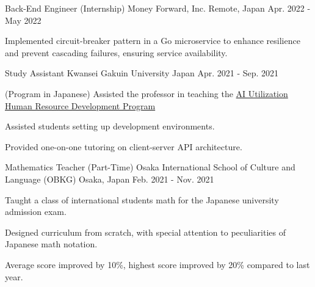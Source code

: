 \begin{cventries}
  \cventry
    {Back-End Engineer (Internship)} %
    {Money Forward, Inc.} %
    {Remote, Japan} %
    {Apr. 2022 - May 2022} %
    {
      \begin{cvitems} %
        \item {Implemented circuit-breaker pattern in a Go microservice to enhance resilience and prevent cascading failures, ensuring service availability.}
      \end{cvitems}
    }


\cventry
  {Study Assistant} %
  {Kwansei Gakuin University} %
  {Japan} %
  {Apr. 2021 - Sep. 2021} %
  {
    \begin{cvjobdesc} %
      (Program in Japanese) Assisted the professor in teaching the \href{https://www.kwansei.ac.jp/education/ai}{AI Utilization Human Resource Development Program}
      \vspace{2.0mm}
      \begin{cvbullets}
      \item {Assisted students setting up development environments.}
      \item {Provided one-on-one tutoring on client-server API architecture.}
      \end{cvbullets}
    \end{cvjobdesc}
  }
  \cventry
    {Mathematics Teacher (Part-Time)} %
    {Osaka International School of Culture and Language (OBKG)} %
    {Osaka, Japan} %
    {Feb. 2021 - Nov. 2021} %
    {
      \begin{cvitems} %
        \item {Taught a class of international students math for the Japanese university admission exam.}
        \item {Designed curriculum from scratch, with special attention to peculiarities of Japanese math notation.}
        \item {Average score improved by 10\%, highest score improved by 20\% compared to last year.}
      \end{cvitems}
    }

\end{cventries}

